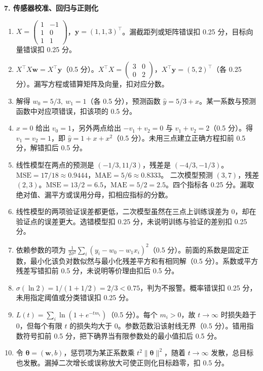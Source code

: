 \noindent\textbf{7. 传感器校准、回归与正则化}
\begin{enumerate}[label=(\arabic*)]
\item $X=\begin{pmatrix}1&-1\\1&0\\1&1\end{pmatrix}$，$\bm y=(1,1,3)^\top$。漏截距列或矩阵错误扣 0.25 分，目标向量错误扣 0.25 分。
\item $X^\top X\bm w=X^\top\bm y$（0.5 分）。$X^\top X=\begin{pmatrix}3&0\\0&2\end{pmatrix}$，$X^\top\bm y=(5,2)^\top$（各 0.25 分）。漏写方程或错算矩阵及向量，扣对应分数。
\item 解得 $w_0=5/3,\ w_1=1$（各 0.5 分），预测函数 $\hat y=5/3+x$。某一系数与预测函数中对应项错误，扣该项的 0.5 分。
\item $x=0$ 给出 $v_0=1$，另外两点给出 $-v_1+v_2=0$ 与 $v_1+v_2=2$（0.5 分）。得 $v_1=v_2=1$，即 $\hat y=1+x+x^2$（0.5 分）。未用三点建立正确方程扣前 0.5 分，解错扣后 0.5 分。
\item 线性模型在两点的预测是 $(-1/3,11/3)$，残差是 $(-4/3,-1/3)$。$\mathrm{MSE}=17/18\approx0.9444$，$\mathrm{MAE}=5/6\approx0.8333$。
二次模型预测 $(3,7)$，残差 $(2,3)$。$\mathrm{MSE}=13/2=6.5$，$\mathrm{MAE}=5/2=2.5$。四个指标各 0.25 分。漏取绝对值、漏平方或误用分母，扣相应指标的分数。
\item 线性模型的两项验证误差都更低，二次模型虽然在三点上训练误差为 0，却在验证点的误差更大。选错模型扣 0.25 分，未说明训练与验证的差别扣 0.25 分。
\item 依赖参数的项为 $\frac{1}{2\sigma^2}\sum_i(y_i-w_0-w_1x_i)^2$（0.5 分）。前面的系数是固定正数，最小化该负对数似然与最小化残差平方和有相同解（0.5 分）。系数或平方残差写错扣前 0.5 分，未说明等价理由扣后 0.5 分。
\item $\sigma(\ln 2)=1/(1+1/2)=2/3<0.75$，判为不报警。概率错误扣 0.25 分，未用指定阈值或分类错误扣 0.25 分。
\item $L(t)=\sum_i\ln(1+e^{-tm_i})$（0.5 分）。每个 $m_i>0$，故 $t\to\infty$ 时损失趋于 0，但每个有限 $t$ 的损失均大于 0。参数范数沿该射线无界（0.5 分）。错用指数符号扣前 0.5 分，把下确界当有限参数处的最小值扣后 0.5 分。
\item 令 $\bm\theta=(\bm w,b)$，惩罚项为某正系数乘 $t^2\|\bm\theta\|^2$，随着 $t\to\infty$ 发散，总目标也发散。漏掉二次增长或误称放大可使正则化目标趋零，扣 0.5 分。
\end{enumerate}

